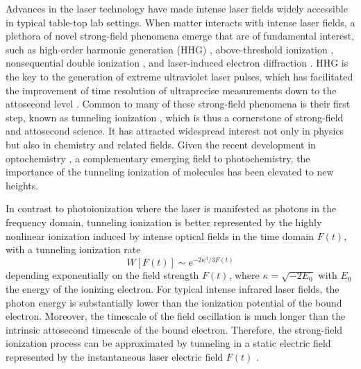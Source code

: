 \documentclass[preprint,12pt]{elsarticle} %
\newcommand{\ee}{\mathrm{e}}    %
\begin{document}
Advances in the laser technology have made intense laser fields widely accessible in typical table-top lab settings. When matter interacts with intense laser fields, a plethora of novel strong-field phenomena emerge that are of fundamental interest, such as high-order harmonic generation (HHG) \cite{krause_high_1992,corkum_plasma_1993,popmintchev_the_2010}, above-threshold ionization \cite{agostini_free_1979,becker_above_2002,milosevic_above_2006}, nonsequential double ionization \cite{walker_precision_1994}, and laser-induced electron diffraction \cite{blaga_imaging_2012,wolter_ultrafast_2016}. HHG is the key to the generation of extreme ultraviolet laser pulses, which has facilitated the improvement of time resolution of ultraprecise measurements down to the attosecond level \cite{krausz_attosecond_2009,dahlstroem_introduction_2012,pazourek_attosecond_2015,kheifets_wigner_2023}. Common to many of these strong-field phenomena is their first step, known as tunneling ionization \cite{keldysh_ionization_1965,chin_from_2004}, which is thus a cornerstone of strong-field and attosecond science. It has attracted widespread interest not only in physics but also in chemistry and related fields. Given the recent development in optochemistry \cite{li_light_2022,ma_transient_2021}, a complementary emerging field to photochemistry, the importance of the tunneling ionization of molecules has been elevated to new heights.

In contrast to photoionization where the laser is manifested as photons in the frequency domain, tunneling ionization is better represented by the highly nonlinear ionization induced by intense optical fields in the time domain $F(t)$, with a tunneling ionization rate \cite{ammosov_tunnel_1986,delone_tunneling_1998}
\begin{equation}
    W[F(t)] \sim \ee^{-2\kappa^3/3F(t)}
    \label{eq:FieldFactor}
\end{equation}
depending exponentially on the field strength $F(t)$, where $\kappa=\sqrt{-2E_0}$ with $E_0$ the energy of the ionizing electron. For typical intense infrared laser fields, the photon energy is substantially lower than the ionization potential of the bound electron. Moreover, the timescale of the field oscillation is much longer than the intrinsic attosecond timescale of the bound electron. Therefore, the strong-field ionization process can be approximated by tunneling in a static electric field represented by the instantaneous laser electric field $F(t)$ \cite{tolstikhin_adiabatic_2010, tolstikhin_adiabatic_2012}.
\end{document}
